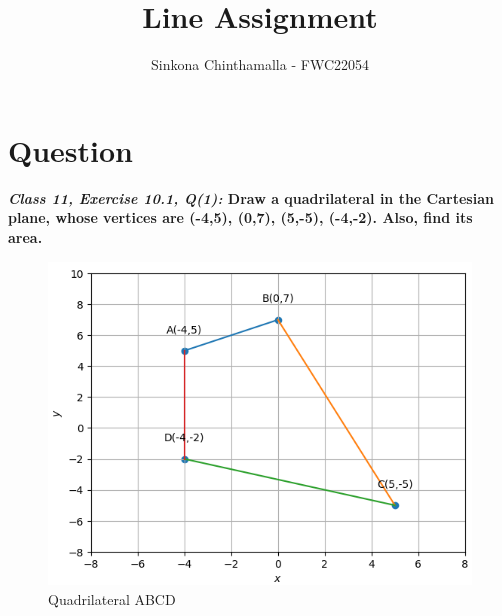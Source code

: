 \documentclass[journal,12pt,twocolumn]{IEEEtran}
\title{\textbf{\\Line Assignment}}
\author{Sinkona Chinthamalla - FWC22054}
\begin{document}
\maketitle


\section{Question}
\textbf{\textit{Class 11, Exercise 10.1, Q(1):} Draw a quadrilateral in the Cartesian plane, whose vertices are (-4,5), (0,7), (5,-5), (-4,-2). Also, find its area.}

\begin{figure}[h!]
\centering
\includegraphics[scale=0.35]{quadrilateral.png}
\centering
\caption{Quadrilateral ABCD}
\end{figure}
\end{document}
